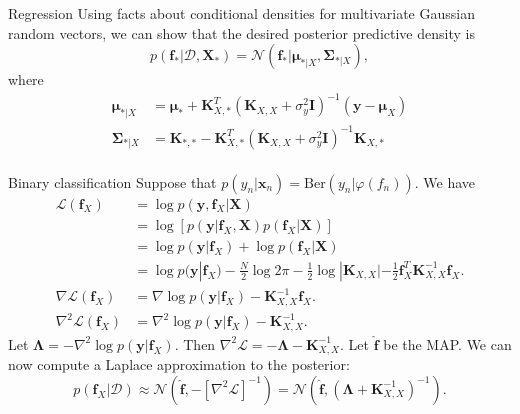 \documentclass{beamer}
\begin{document}
\begin{frame}{Regression}
    Using facts about conditional densities for multivariate Gaussian random vectors, we can show that the desired posterior predictive density is
    \[
    p(\boldsymbol{f}_* | \mathcal{D}, \boldsymbol{X}_*) = \mathcal{N}(\boldsymbol{f}_* | \boldsymbol{\mu}_{* | X}, \boldsymbol{\Sigma}_{* | X}),
    \]
    where
    \begin{align*}
        \boldsymbol{\mu}_{* | X} &= \boldsymbol{\mu}_* + \boldsymbol{K}_{X, *}^T(\boldsymbol{K}_{X, X} + \sigma_y^2 \boldsymbol{I})^{-1}(\boldsymbol{y} - \boldsymbol{\mu}_X) \\
        \boldsymbol{\Sigma}_{* | X} &= \boldsymbol{K}_{*, *} - \boldsymbol{K}_{X, *}^T(\boldsymbol{K}_{X, X} + \sigma_y^2 \boldsymbol{I})^{-1}\boldsymbol{K}_{X, *}\\
    \end{align*}
\end{frame}

\begin{frame}{Binary classification}
    Suppose that $p(y_n | \boldsymbol{x}_n) = \text{Ber}(y_n | \varphi(f_n))$. We have
    \begin{align*}
        \mathcal{L}(\boldsymbol{f}_X) &= \log p(\boldsymbol{y}, \boldsymbol{f}_X | \boldsymbol{X}) \\
        &= \log[p(\boldsymbol{y} | \boldsymbol{f}_X, \boldsymbol{X})p(\boldsymbol{f}_X | \boldsymbol{X})] \\
        &= \log p(\boldsymbol{y} | \boldsymbol{f}_X) + \log p(\boldsymbol{f}_X | \boldsymbol{X}) \\
        &= \log p(\boldsymbol{y} | \boldsymbol{f}_X) -\frac{N}{2}\log 2\pi - \frac{1}{2}\log|\boldsymbol{K}_{X, X}| - \frac{1}{2}\boldsymbol{f}_X^T\boldsymbol{K}_{X, X}^{-1}\boldsymbol{f}_X. \\
        \nabla\mathcal{L}(\boldsymbol{f}_X) &= \nabla\log p(\boldsymbol{y} | \boldsymbol{f}_X) - \boldsymbol{K}_{X, X}^{-1}\boldsymbol{f}_X. \\
        \nabla^2 \mathcal{L}(\boldsymbol{f}_X) &= \nabla^2 \log p(\boldsymbol{y} | \boldsymbol{f}_X) - \boldsymbol{K}_{X, X}^{-1}.
    \end{align*}
    Let $\boldsymbol{\Lambda} = -\nabla^2 \log p(\boldsymbol{y} | \boldsymbol{f}_X)$. Then $\nabla^2 \mathcal{L} = -\boldsymbol{\Lambda} - \boldsymbol{K}_{X, X}^{-1}$. Let $\hat{\boldsymbol{f}}$ be the MAP. We can now compute a Laplace approximation to the posterior:
    \[
    p(\boldsymbol{f}_X | \mathcal{D}) \approx \mathcal{N}(\hat{\boldsymbol{f}}, -[\nabla^2 \mathcal{L}]^{-1}) = \mathcal{N}(\hat{\boldsymbol{f}}, (\boldsymbol{\Lambda} + \boldsymbol{K}_{X, X}^{-1})^{-1}).
    \]
\end{frame}
\end{document}
